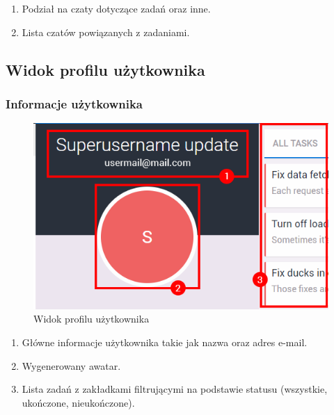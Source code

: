 \documentclass[eng,printmode]{mgr}
\begin{document}
\begin{enumerate}
  \item Podział na czaty dotyczące zadań oraz inne.
  \item Lista czatów powiązanych z zadaniami.
\end{enumerate}
\newpage

\subsection{Widok profilu użytkownika}
\subsubsection{Informacje użytkownika}
\begin{figure}[H]
  \begin{center}
  \includegraphics[scale=0.8]{profile}
  \end{center}
  \caption{Widok profilu użytkownika}
\end{figure}

\begin{enumerate}
  \item Główne informacje użytkownika takie jak nazwa oraz adres e-mail.
  \item Wygenerowany awatar.
  \item Lista zadań z zakładkami filtrującymi na podstawie statusu (wszystkie, ukończone, nieukończone).
 \end{enumerate}
\newpage
\end{document}
